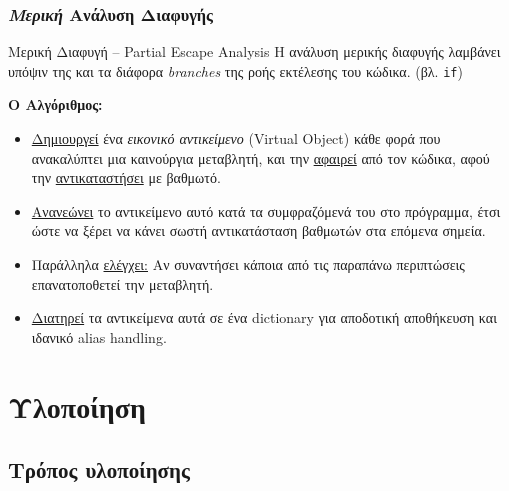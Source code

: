 \documentclass[greek]{beamer}
\begin{document}
\begin{frame}
\frametitle{\textit{Μερική} Ανάλυση Διαφυγής}

\begin{block}{Μερική Διαφυγή – \textlatin{Partial Escape Analysis}}
Η ανάλυση μερικής διαφυγής λαμβάνει υπόψιν της και τα διάφορα
\textit{\textlatin{branches}} της ροής εκτέλεσης του κώδικα.
(βλ. \texttt{\textlatin{if}})
\end{block}

\vspace{5mm}

\textbf{Ο Αλγόριθμος\cite{stadler2014partial}:}

\begin{itemize}
	\item \underline{Δημιουργεί} ένα \textit{εικονικό αντικείμενο} (\textlatin{Virtual Object}) κάθε
    	φορά που ανακαλύπτει μια καινούργια μεταβλητή, και την \underline{αφαιρεί} από τον κώδικα, αφού
        την \underline{αντικαταστήσει} με βαθμωτό.
	\item \underline{Ανανεώνει} το αντικείμενο αυτό κατά τα συμφραζόμενά του στο πρόγραμμα, έτσι ώστε να
    	ξέρει να κάνει σωστή αντικατάσταση βαθμωτών στα επόμενα σημεία.
    \item Παράλληλα \underline{ελέγχει:} Αν συναντήσει κάποια από τις παραπάνω περιπτώσεις επανατοποθετεί
    	την μεταβλητή.
    \item \underline{Διατηρεί} τα αντικείμενα αυτά σε ένα \textlatin{dictionary} για αποδοτική αποθήκευση και 			ιδανικό \textlatin{alias handling}.
\end{itemize}

\end{frame}


\section{Υλοποίηση}
\subsection{Τρόπος υλοποίησης}
\end{document}
